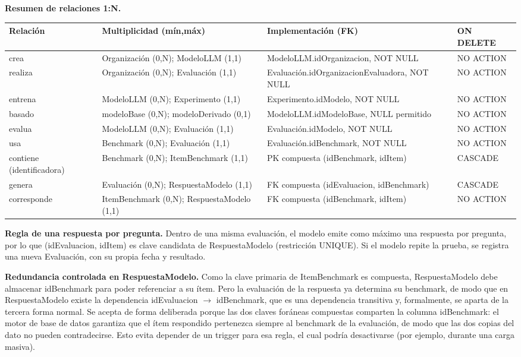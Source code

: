 \documentclass[12pt,a4paper]{article}
\begin{document}
\textbf{Resumen de relaciones 1:N.}

\begin{longtable}{|>{\raggedright\arraybackslash}p{2.7cm}|>{\raggedright\arraybackslash}p{4.3cm}|>{\raggedright\arraybackslash}p{4.9cm}|>{\raggedright\arraybackslash}p{2.0cm}|}
\hline
\textbf{Relación} & \textbf{Multiplicidad (mín,máx)} & \textbf{Implementación (FK)} & \textbf{ON DELETE} \\
\hline
crea & Organización (0,N); ModeloLLM (1,1) & ModeloLLM.\allowbreak idOrganizacion, NOT NULL & NO ACTION \\
\hline
realiza & Organización (0,N); Evaluación (1,1) & Evaluación.\allowbreak idOrganizacion\allowbreak Evaluadora, NOT NULL & NO ACTION \\
\hline
entrena & ModeloLLM (0,N); Experimento (1,1) & Experimento.idModelo, NOT NULL & NO ACTION \\
\hline
basado & modeloBase (0,N); modeloDerivado (0,1) & ModeloLLM.idModeloBase, NULL permitido & NO ACTION \\
\hline
evalua & ModeloLLM (0,N); Evaluación (1,1) & Evaluación.idModelo, NOT NULL & NO ACTION \\
\hline
usa & Benchmark (0,N); Evaluación (1,1) & Evaluación.idBenchmark, NOT NULL & NO ACTION \\
\hline
contiene (identificadora) & Benchmark (0,N); ItemBenchmark (1,1) & PK compuesta (idBenchmark, idItem) & CASCADE \\
\hline
genera & Evaluación (0,N); RespuestaModelo (1,1) & FK compuesta (idEvaluacion, idBenchmark) & CASCADE \\
\hline
corresponde & ItemBenchmark (0,N); RespuestaModelo (1,1) & FK compuesta (idBenchmark, idItem) & NO ACTION \\
\hline
\end{longtable}

\textbf{Regla de una respuesta por pregunta.} Dentro de una misma evaluación, el modelo emite como máximo una respuesta por pregunta, por lo que (idEvaluacion, idItem) es clave candidata de RespuestaModelo (restricción UNIQUE). Si el modelo repite la prueba, se registra una nueva Evaluación, con su propia fecha y resultado.

\textbf{Redundancia controlada en RespuestaModelo.} Como la clave primaria de ItemBenchmark es compuesta, RespuestaModelo debe almacenar idBenchmark para poder referenciar a su ítem. Pero la evaluación de la respuesta ya determina su benchmark, de modo que en RespuestaModelo existe la dependencia idEvaluacion $\rightarrow$ idBenchmark, que es una dependencia transitiva y, formalmente, se aparta de la tercera forma normal. Se acepta de forma deliberada porque las dos claves foráneas compuestas comparten la columna idBenchmark: el motor de base de datos garantiza que el ítem respondido pertenezca siempre al benchmark de la evaluación, de modo que las dos copias del dato no pueden contradecirse. Esto evita depender de un trigger para esa regla, el cual podría desactivarse (por ejemplo, durante una carga masiva).
\end{document}
